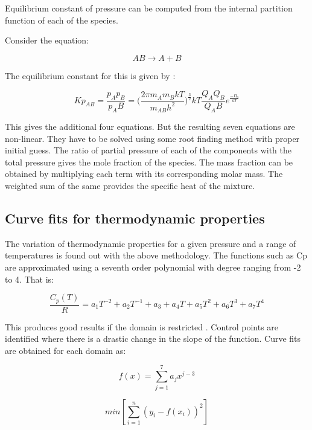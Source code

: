 \documentclass[]{aelab_aiaa-tc}%
\begin{document}
Equilibrium constant of pressure can be computed from the internal partition function of each of the species.

Consider the equation:

$$ AB \longrightarrow A + B $$

The equilibrium constant for this is given by \cite{Tatum:1}:

%
\begin{equation}
	Kp_{AB} = \frac{p_A p_B}{p_AB} = \bigg( \frac{2 \pi m_A m_B k T}{m_{AB} h^2} \bigg)  ^ {\frac{3}{2}} k T \frac{Q_A Q_B}{Q_AB} e^{\frac{-D_0}{kT}}
\end{equation}

This gives the additional four equations. But the resulting seven equations are non-linear. They have to be solved using some root finding method with proper initial guess. The ratio of partial pressure of each of the components with the total pressure gives the mole fraction of the species. The mass fraction can be obtained by multiplying each term with its corresponding molar mass. The weighted sum of the same provides the specific heat of the mixture.

\subsection{Curve fits for thermodynamic properties}

The variation of thermodynamic properties for a given pressure and a range of temperatures is found out with the above methodology. The functions such as Cp are approximated using a seventh order polynomial with degree ranging from -2 to 4. That is:


\begin{equation}
\frac{C_{p}(T)}{R} = a_{1}T^{-2} + a_{2}T^{-1} + a_{3} + a_{4}T + a_{5}T^{2} + a_{6}T^{3} + a_{7}T^{4}
\end{equation}

This produces good results if the domain is restricted \cite{tanehill:1}. Control points are identified where there is a drastic change in the slope of the function. Curve fits are obtained for each domain as: 


\begin{equation}
f(x) = \sum\limits_{j=1}^{7}a_{j}x^{j-3}
\end{equation}

\begin{equation}
min\left[\sum\limits_{i=1}^{n}(y_{i} - f(x_{i}))^2\right]
\end{equation}
\end{document}
